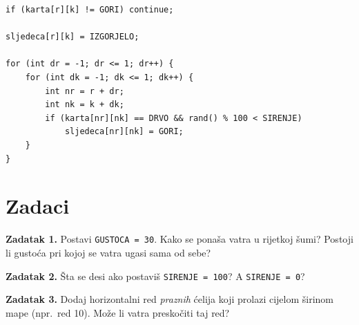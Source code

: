 \documentclass[11pt]{article}
\begin{document}
\begin{lstlisting}
if (karta[r][k] != GORI) continue;

sljedeca[r][k] = IZGORJELO;

for (int dr = -1; dr <= 1; dr++) {
    for (int dk = -1; dk <= 1; dk++) {
        int nr = r + dr;
        int nk = k + dk;
        if (karta[nr][nk] == DRVO && rand() % 100 < SIRENJE)
            sljedeca[nr][nk] = GORI;
    }
}
\end{lstlisting}

\section{Zadaci}

\textbf{Zadatak 1.}
Postavi \texttt{GUSTOCA = 30}. Kako se ponaša vatra u rijetkoj šumi?
Postoji li gustoća pri kojoj se vatra ugasi sama od sebe?

\medskip
\textbf{Zadatak 2.}
Šta se desi ako postaviš \texttt{SIRENJE = 100}? A \texttt{SIRENJE = 0}?

\medskip
\textbf{Zadatak 3.}
Dodaj horizontalni red \emph{praznih} ćelija koji prolazi cijelom širinom
mape (npr.\ red 10). Može li vatra preskočiti taj red?
\end{document}
